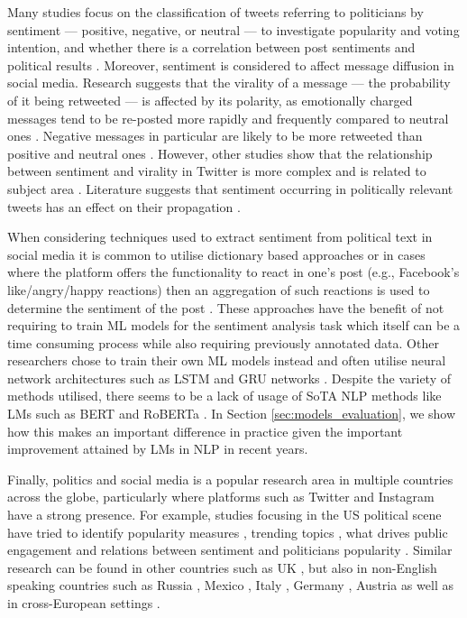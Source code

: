 Many studies focus on the classification of tweets referring to politicians by sentiment --- positive, negative, or neutral --- to investigate popularity and voting intention, and whether there is a correlation between post sentiments and political results \cite{taddy2013measuring,vilares2015megaphone,kermanidis2013political}. Moreover,  sentiment is considered to affect message diffusion in social media. Research suggests that the virality of a message --- the probability of it being retweeted --- is affected by its polarity, as emotionally charged messages tend to be re-posted more rapidly and frequently compared to neutral ones \cite{stieglitz2013emotions}. Negative messages in particular are likely to be more retweeted than positive and neutral ones \cite{tsugawa2015negative}. However, other studies show that the relationship between sentiment and virality in Twitter is more complex and is related to subject area \cite{hansen2011good}. Literature suggests that sentiment occurring in politically relevant tweets has an effect on their propagation \cite{stieglitz2011role, stieglitz2012political}.


When considering techniques used to extract sentiment from political text in social media it is common to utilise dictionary based approaches \cite{karami2019political, heidenreich2020political, rathje2021out}  or in cases where the platform offers the functionality to react in one's post (e.g., Facebook's like/angry/happy reactions) then an aggregation of such reactions is used to determine the sentiment of the post \cite{sandoval2018facebook,sandoval2020sentiment}. These approaches have the benefit of not requiring to train \ac{ML} models for the sentiment analysis task which itself can be a time consuming process while also requiring previously annotated data. Other researchers chose to train their own ML models instead and often utilise neural network architectures such as LSTM and GRU networks \cite{svetlov2019sentiment, dorle2018political}. Despite the variety of methods utilised, there seems to be a lack of usage of \ac{SoTA} \ac{NLP} methods like \acp{LM} such as BERT \cite{BERT} and RoBERTa \cite{ROBERTA}. In Section \ref{sec:models_evaluation}, we show how this makes an important difference in practice given the important improvement attained by \acp{LM}  in \ac{NLP} in recent years.

Finally, politics and social media is a popular research area in multiple countries across the globe, particularly where platforms such as Twitter and Instagram have a strong presence. For example, studies focusing in the US political scene have tried to identify popularity measures \cite{peng2021makes}, trending topics \cite{karami2019political}, what drives public engagement \cite{rathje2021out} and relations between sentiment and politicians popularity \cite{joyce2017sentiment}. Similar research can be found in other countries such as UK  \cite{mee2021sentiment}, but also in non-English speaking countries such as Russia \cite{svetlov2019sentiment}, Mexico \cite{sandoval2020sentiment},  Italy \cite{ceron2016campaigning}, Germany \cite{stieglitz2012political}, Austria \cite{kuvsen2018politics}  as well as in cross-European settings  \cite{heidenreich2020political}.


